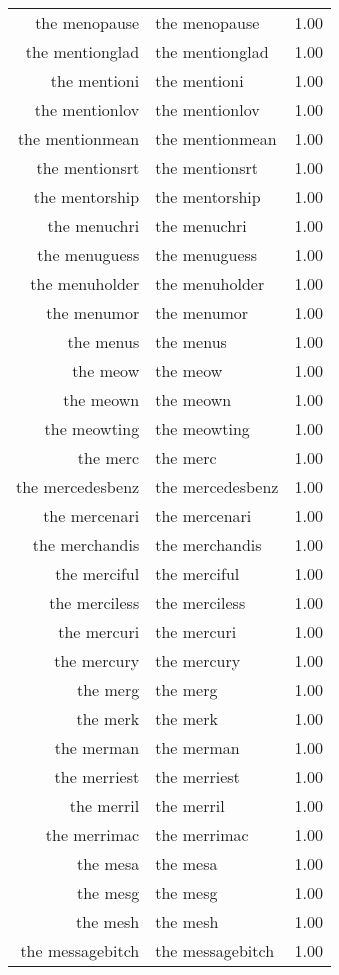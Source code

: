 \begin{table}[ht]
\begin{tabular}{rlr}
  the menopause & the menopause & 1.00 \\ 
  the mentionglad & the mentionglad & 1.00 \\ 
  the mentioni & the mentioni & 1.00 \\ 
  the mentionlov & the mentionlov & 1.00 \\ 
  the mentionmean & the mentionmean & 1.00 \\ 
  the mentionsrt & the mentionsrt & 1.00 \\ 
  the mentorship & the mentorship & 1.00 \\ 
  the menuchri & the menuchri & 1.00 \\ 
  the menuguess & the menuguess & 1.00 \\ 
  the menuholder & the menuholder & 1.00 \\ 
  the menumor & the menumor & 1.00 \\ 
  the menus & the menus & 1.00 \\ 
  the meow & the meow & 1.00 \\ 
  the meown & the meown & 1.00 \\ 
  the meowting & the meowting & 1.00 \\ 
  the merc & the merc & 1.00 \\ 
  the mercedesbenz & the mercedesbenz & 1.00 \\ 
  the mercenari & the mercenari & 1.00 \\ 
  the merchandis & the merchandis & 1.00 \\ 
  the merciful & the merciful & 1.00 \\ 
  the merciless & the merciless & 1.00 \\ 
  the mercuri & the mercuri & 1.00 \\ 
  the mercury & the mercury & 1.00 \\ 
  the merg & the merg & 1.00 \\ 
  the merk & the merk & 1.00 \\ 
  the merman & the merman & 1.00 \\ 
  the merriest & the merriest & 1.00 \\ 
  the merril & the merril & 1.00 \\ 
  the merrimac & the merrimac & 1.00 \\ 
  the mesa & the mesa & 1.00 \\ 
  the mesg & the mesg & 1.00 \\ 
  the mesh & the mesh & 1.00 \\ 
  the messagebitch & the messagebitch & 1.00 \\ 

\end{tabular}
\end{table}

